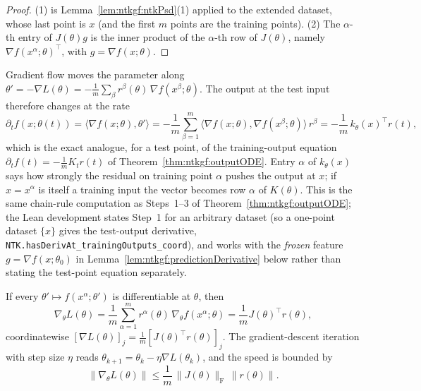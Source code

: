 \begin{proof}
  \leanok
(1) is Lemma~\ref{lem:ntkgf:ntkPsd}(1) applied to the extended dataset, whose last point is $x$ (and the first $m$ points are the training points). (2) The $\alpha$-th entry of $J(\theta)g$ is the inner product of the $\alpha$-th row of $J(\theta)$, namely $\nabla f(x^\alpha;\theta)^\top$, with $g=\nabla f(x;\theta)$.
\end{proof}

\begin{remark}\label{rmk:ntkgf:crossKernelMeaning}
Gradient flow moves the parameter along $\theta'=-\nabla L(\theta)=-\frac1m\sum_\beta r^\beta(\theta)\,\nabla f(x^\beta;\theta)$. The output at the test input therefore changes at the rate
\[
  \partial_t f(x;\theta(t))=\bigl\langle\nabla f(x;\theta),\theta'\bigr\rangle=-\frac1m\sum_{\beta=1}^m\bigl\langle\nabla f(x;\theta),\nabla f(x^\beta;\theta)\bigr\rangle\,r^\beta=-\frac1m\,k_\theta(x)^\top r(t),
\]
which is the exact analogue, for a test point, of the training-output equation $\partial_tf(t)=-\frac1mK_tr(t)$ of Theorem~\ref{thm:ntkgf:outputODE}. Entry $\alpha$ of $k_\theta(x)$ says how strongly the residual on training point $\alpha$ pushes the output at $x$; if $x=x^\alpha$ is itself a training input the vector becomes row $\alpha$ of $K(\theta)$.
This is the same chain-rule computation as Steps~1--3 of Theorem~\ref{thm:ntkgf:outputODE}; the Lean development states Step~1 for an arbitrary dataset (so a one-point dataset $\{x\}$ gives the test-output derivative, \texttt{NTK.hasDerivAt\_trainingOutputs\_coord}), and works with the \emph{frozen} feature $g=\nabla f(x;\theta_0)$ in
Lemma~\ref{lem:ntkgf:predictionDerivative} below rather than stating the test-point equation separately.
\end{remark}

\begin{theorem}\label{thm:ntkgf:mseGradient}
  \leanok
If every $\theta'\mapsto f(x^\alpha;\theta')$ is differentiable at $\theta$, then
\[
  \nabla_\theta L(\theta)=\frac1m\sum_{\alpha=1}^mr^\alpha(\theta)\,\nabla_\theta f(x^\alpha;\theta)=\frac1mJ(\theta)^\top r(\theta),
\]
coordinatewise $[\nabla L(\theta)]_j=\frac1m[J(\theta)^\top r(\theta)]_j$. The gradient-descent iteration with step size $\eta$
reads $\theta_{k+1}=\theta_k-\eta\nabla L(\theta_k)$, and the speed is bounded by
\[
  \|\nabla_\theta L(\theta)\|\le\frac1m\,\|J(\theta)\|_{\mathrm F}\,\|r(\theta)\| .
\]
\end{theorem}

